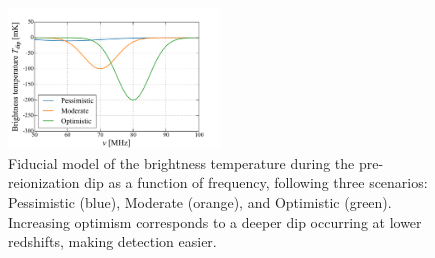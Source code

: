 \documentclass[twocolumn,apj,numberedappendix]{emulateapj}
\begin{document}
\begin{figure}[h]
	\centering
	\includegraphics[width=0.5\textwidth] {figures/dipScenarios.pdf}
	\caption{Fiducial model of the brightness temperature during the pre-reionization dip as a function of frequency, following three scenarios: Pessimistic (blue), Moderate (orange), and Optimistic (green). Increasing optimism corresponds to a deeper dip occurring at lower redshifts, making detection easier.}
	\label{fig:dipScenarios}
\end{figure}
\end{document}
